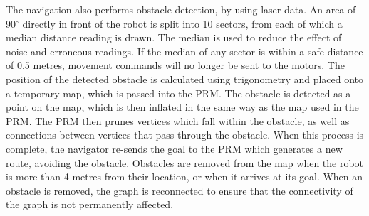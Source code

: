 \documentclass[conference]{IEEEtran}
\begin{document}
The navigation also performs obstacle detection, by using laser data. An area of 90$^\circ$ directly in front of the robot is split into 10 sectors, from each of which a median distance reading is drawn. The median is used to reduce the effect of noise and erroneous readings. If the median of any sector is within a safe distance of 0.5 metres, movement commands will no longer be sent to the motors. The position of the detected obstacle is calculated using trigonometry and placed onto a temporary map, which is passed into the PRM. The obstacle is detected as a point on the map, which is then inflated in the same way as the map used in the PRM. The PRM then prunes vertices which fall within the obstacle, as well as connections between vertices that pass through the obstacle. When this process is complete, the navigator re-sends the goal to the PRM which generates a new route, avoiding the obstacle. Obstacles are removed from the map when the robot is more than 4 metres from their location, or when it arrives at its goal. When an obstacle is removed, the graph is reconnected to ensure that the connectivity of the graph is not permanently affected.
\end{document}
